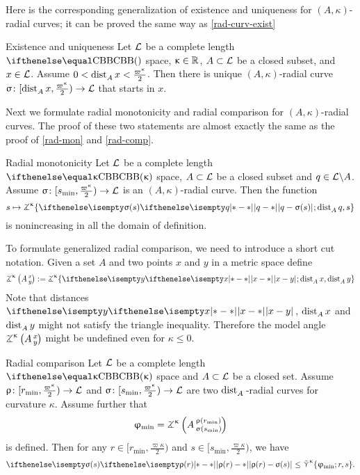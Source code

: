 Here is the corresponding generalization of existence and uniqueness 
for $(A,\kappa)$-radial curves;
it can be proved the same way as \ref{rad-curv-exist}

\begin{thm}{Existence and uniqueness}
Let $\mathcal{L}$ be a complete length $\Alex{}$ space, 
$\kappa\in\RR$, 
$A\subset\spc{L}$ be a closed subset, 
and $x\in \spc{L}$.
Assume
$0
<
\distfun{A}{x}{}
<
\tfrac{\varpi\kappa}2$.
Then there is unique $(A,\kappa)$-radial curve $\sigma\:[\distfun{A}{x}{},\tfrac{\varpi\kappa}2)\to \spc{L}$ 
that starts in $x$.
\end{thm}

Next we formulate radial monotonicity and radial comparison for $(A,\kappa)$-radial curves.
The proof of these two statements are almost exactly the same as the proof of \ref{rad-mon} and \ref{rad-comp}.

\begin{thm}{Radial monotonicity}\label{gen-rad-mon}
Let $\mathcal{L}$ be a complete length $\Alex{\kappa}$ space,
$A\subset \spc{L}$ be a closed subset
and $q\in\spc{L}\backslash A$.
Assume $\sigma\:  [s_{\min},\tfrac{\varpi\kappa}2)\to \spc{L}$
is an $(A,\kappa)$-radial curve.
Then the function 
\[s\mapsto 
\tangle\mc\kappa\{
\dist{q}{\sigma(s)}{};
\distfun{A}{q}{},
s
\}\]
is nonincreasing in all the domain of definition.
\end{thm}

To formulate generalized radial comparison,
we need to introduce a short cut notation.
Given a set $A$ and two points $x$ and $y$ in a metric space define
\[
\angkk\kappa A{x}{y}
\df
\tangle\mc\kappa\{
\dist{x}{y}{};
\distfun{A}{x}{},
\distfun{A}{y}{}
\}
\]
Note that distances $\dist{x}{y}{}$, 
$\mathop{\rm dist}\nolimits_{A}^{{}}{x}{}$ and 
$\mathop{\rm dist}\nolimits_{A}^{{}}{y}{}$ might not satisfy the triangle inequality.
Therefore the model angle 
$\angkk\kappa A{x}{y}$ might be undefined even for $\kappa\le0$.

\begin{thm}{Radial comparison}\label{gen-rad-comp}
Let $\mathcal{L}$ be a complete length $\Alex{\kappa}$ space 
and $A\subset \spc{L}$ be a closed set.
Assume $\rho\:  [r_{\min},\tfrac{\varpi\kappa}2)\to \spc{L}$
and    $\sigma\:[s_{\min},\tfrac{\varpi\kappa}2)\to \spc{L}$
are two $\mathop{\rm dist}\nolimits_{A}^{{}}{}{}$-radial curves for curvature $\kappa$.
Assume further that 
\[\phi_{\min}
=
\angkk\kappa A{\rho(r_{\min})}{\sigma(s_{\min})}
\]
is defined.
Then for any $r\in[r_{\min},\tfrac{\varpi\kappa}2)$ and  $s\in[s_{\min},\tfrac{\varpi\kappa}2)$,
we have
\[
\dist{\rho(r)}{\sigma(s)}{}
\le \side\kappa\{\phi_{\min};r,s\}.
\]

\end{thm}

